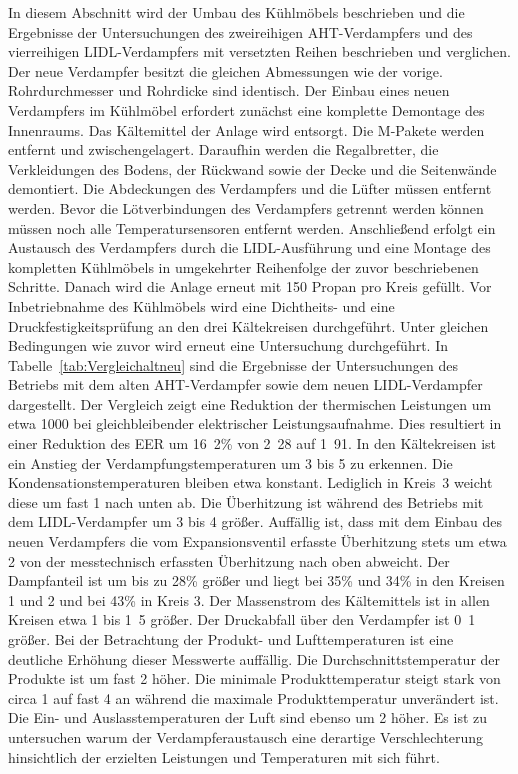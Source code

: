 In diesem Abschnitt wird der Umbau des Kühlmöbels beschrieben und die Ergebnisse der Untersuchungen des zweireihigen AHT-Verdampfers und des vierreihigen LIDL-Verdampfers mit versetzten Reihen beschrieben und verglichen. Der neue Verdampfer besitzt die gleichen Abmessungen wie der vorige. Rohrdurchmesser und Rohrdicke sind identisch. Der Einbau eines neuen Verdampfers im Kühlmöbel erfordert zunächst eine komplette Demontage des Innenraums. Das Kältemittel der Anlage wird entsorgt. Die M-Pakete werden entfernt und zwischengelagert. Daraufhin werden die Regalbretter, die Verkleidungen des Bodens, der Rückwand sowie der Decke und die Seitenwände demontiert. Die Abdeckungen des Verdampfers und die Lüfter müssen entfernt werden. Bevor die Lötverbindungen des Verdampfers getrennt werden können müssen noch alle Temperatursensoren entfernt werden. Anschließend erfolgt ein Austausch des Verdampfers durch die LIDL-Ausführung und eine Montage des kompletten Kühlmöbels in umgekehrter Reihenfolge der zuvor beschriebenen Schritte. Danach wird die Anlage erneut mit \unit{150}{\gram} Propan pro Kreis gefüllt. Vor Inbetriebnahme des Kühlmöbels wird eine Dichtheits- und eine Druckfestigkeitsprüfung an den drei Kältekreisen durchgeführt. Unter gleichen Bedingungen wie zuvor wird erneut eine Untersuchung durchgeführt. \newline 
In Tabelle~\ref{tab:Vergleichaltneu} sind die Ergebnisse der Untersuchungen des Betriebs mit dem alten AHT-Verdampfer sowie dem neuen LIDL-Verdampfer dargestellt.
Der Vergleich zeigt eine Reduktion der thermischen Leistungen um etwa \unit{1000}{\watt} bei gleichbleibender elektrischer Leistungsaufnahme. Dies resultiert in einer Reduktion des EER um \unit{16.2}{\%} von \unit{2.28}{} auf \unit{1.91}{}. In den Kältekreisen ist ein Anstieg der Verdampfungstemperaturen um \unit{3}{\kelvin} bis \unit{5}{\kelvin} zu erkennen. Die Kondensationstemperaturen bleiben etwa konstant. Lediglich in Kreis~3 weicht diese um fast \unit{1}{\kelvin} nach unten ab. Die Überhitzung ist während des Betriebs mit dem LIDL-Verdampfer um \unit{3}{\kelvin} bis \unit{4}{\kelvin} größer. Auffällig ist, dass mit dem Einbau des neuen Verdampfers die vom Expansionsventil erfasste Überhitzung stets um etwa \unit{2}{\kelvin} von der messtechnisch erfassten Überhitzung nach oben abweicht. Der Dampfanteil ist um bis zu \unit{28}{\%} größer und liegt bei \unit{35}{\%} und \unit{34}{\%} in den Kreisen 1 und 2 und bei \unit{43}{\%} in Kreis 3. Der Massenstrom des Kältemittels ist in allen Kreisen etwa \unit{1}{\gram} bis \unit{1.5}{\gram} größer. Der Druckabfall über den Verdampfer ist \unit{0.1}{\bbar} größer. \newline
Bei der Betrachtung der Produkt- und Lufttemperaturen ist eine deutliche Erhöhung dieser Messwerte auffällig. Die Durchschnittstemperatur der Produkte ist um fast \unit{2}{\kelvin} höher. Die minimale Produkttemperatur steigt stark von circa \unit{1}{\celsius} auf fast \unit{4}{\celsius} an während die maximale Produkttemperatur unverändert ist. Die Ein- und Auslasstemperaturen der Luft sind ebenso um \unit{2}{\kelvin} höher. \newline
Es ist zu untersuchen warum der Verdampferaustausch eine derartige Verschlechterung hinsichtlich der erzielten Leistungen und Temperaturen mit sich führt.


